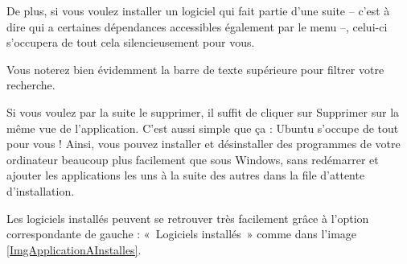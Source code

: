 {De plus, si vous voulez installer un logiciel qui fait partie d'une suite -- c'est à dire qui a certaines dépendances accessibles également par le menu --, celui-ci s'occupera de tout cela silencieusement pour vous.\par
{}
\begin{nota}
Vous noterez bien évidemment la barre de texte supérieure pour filtrer votre recherche.
\end{nota}
Si vous voulez par la suite le supprimer, il suffit de cliquer sur Supprimer sur la même vue de l'application. C'est aussi simple que ça : Ubuntu s'occupe de tout pour vous ! Ainsi, vous pouvez installer et désinstaller des programmes de votre ordinateur beaucoup plus facilement que sous Windows, sans redémarrer et ajouter les applications les uns à la suite des autres dans la file d'attente d'installation.\par
Les logiciels installés peuvent se retrouver très facilement grâce à l'option correspondante de gauche : «~Logiciels installés~» comme dans l'image \ref{ImgApplicationAInstalles}.
}
